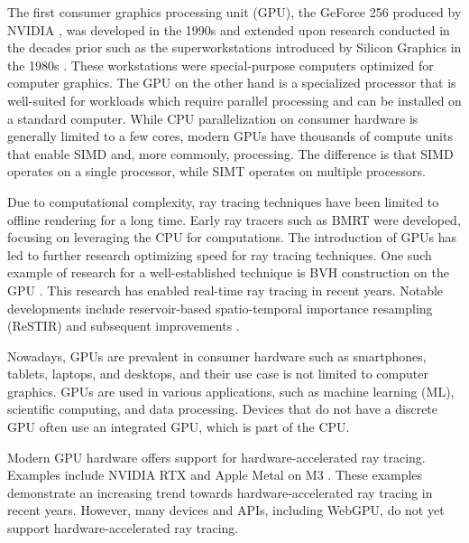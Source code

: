 The first consumer graphics processing unit (\gls{GPU}), the GeForce 256 produced by NVIDIA \cite{evolutionOfGPU}, was developed in the 1990s and extended upon research conducted in the decades prior such as the superworkstations introduced by Silicon Graphics in the 1980s \cite{sigWorkstation}. These workstations were special-purpose computers optimized for computer graphics. The \gls{GPU} on the other hand is a specialized processor that is well-suited for workloads which require parallel processing and can be installed on a standard computer. While \gls{CPU} parallelization on consumer hardware is generally limited to a few cores, modern \glspl{GPU} have thousands of compute units that enable \gls{SIMD} and, more commonly,  processing. The difference is that \gls{SIMD} operates on a single processor, while \gls{SIMT} operates on multiple processors.

Due to computational complexity, ray tracing techniques have been limited to offline rendering for a long time. Early ray tracers such as \gls{BMRT} were developed, focusing on leveraging the \gls{CPU} for computations. The introduction of \glspl{GPU} has led to further research optimizing speed for ray tracing techniques. One such example of research for a well-established technique is \gls{BVH} construction on the \gls{GPU} \cite{lauterbach2009GPUbvh}. This research has enabled real-time ray tracing in recent years. Notable developments include reservoir-based spatio-temporal importance resampling (\gls{ReSTIR}) \cite{restir} and subsequent improvements \cite{restirAdvancements,restirGeneralized,restirArea}.

Nowadays, \glspl{GPU} are prevalent in consumer hardware such as smartphones, tablets, laptops, and desktops, and their use case is not limited to computer graphics. \glspl{GPU} are used in various applications, such as machine learning (\gls{ML}), scientific computing, and data processing. Devices that do not have a discrete \gls{GPU} often use an integrated \gls{GPU}, which is part of the \gls{CPU}.

Modern \gls{GPU} hardware offers support for hardware-accelerated ray tracing. Examples include NVIDIA RTX \cite{nvidiaRtxRayTracing} and Apple \gls{Metal} on M3 \cite{appleM3GpuAdvancements}. These examples demonstrate an increasing trend towards hardware-accelerated ray tracing in recent years. However, many devices and \glspl{API}, including \gls{WebGPU}, do not yet support hardware-accelerated ray tracing.

